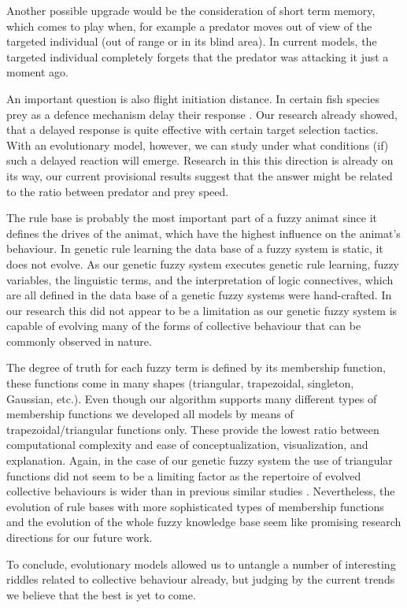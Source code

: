 Another possible upgrade would be the consideration of short term memory, which comes to play when, for example a predator moves out of view of the targeted individual (out of range or in its blind area). In current models, the targeted individual completely forgets that the predator was attacking it just a moment ago.

An important question is also flight initiation distance. In certain fish species prey as a defence mechanism delay their response \cite{partridge1982structure}. Our research already showed, that a delayed response is quite effective with certain target selection tactics. With an evolutionary model, however, we can study under what conditions (if) such a delayed reaction will emerge. Research in this this direction is already on its way, our current provisional results suggest that the answer might be related to the ratio between predator and prey speed.

The rule base is probably the most important part of a fuzzy animat since it defines the drives of the animat, which have the highest influence on the animat's behaviour. In genetic rule learning the data base of a fuzzy system is static, it does not evolve. As our genetic fuzzy system executes genetic rule learning, fuzzy variables, the linguistic terms, and the interpretation of logic connectives, which are all defined in the data base of a genetic fuzzy systems were hand-crafted. In our research this did not appear to be a limitation as our genetic fuzzy system is capable of evolving many of the forms of collective behaviour that can be commonly observed in nature.

The degree of truth for each fuzzy term is defined by its membership function, these functions come in many shapes (triangular, trapezoidal, singleton, Gaussian, etc.). Even though our algorithm supports many different types of membership functions we developed all models by means of trapezoidal/triangular functions only. These provide the lowest ratio between computational complexity and ease of conceptualization, visualization, and explanation. Again, in the case of our genetic fuzzy system the use of triangular functions did not seem to be a limiting factor as the repertoire of evolved collective behaviours is wider than in previous similar studies \cite{biswas2014causes,hein2015evolution,olson2013predator,olson2015exploring,olson2016evolution,reynolds1993evolved,sayers2009evolved,spector2003emergence,wood2007evolving}. Nevertheless, the evolution of rule bases with more sophisticated types of membership functions and the evolution of the whole fuzzy knowledge base seem like promising research directions for our future work.

To conclude, evolutionary models allowed us to untangle a number of interesting riddles related to collective behaviour already, but judging by the current trends we believe that the best is yet to come.